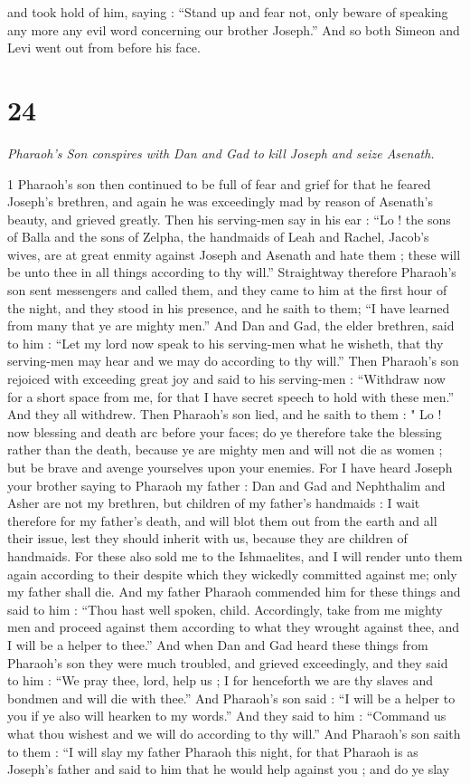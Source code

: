 and took hold of him, saying : “Stand up and fear not, only beware of speaking any more any evil word concerning our brother Joseph.” And so both Simeon and Levi went out from before his face. 

\chapter{24}

\par \textit{Pharaoh's Son conspires with Dan and Gad to kill Joseph and seize Asenath.}


1 Pharaoh's son then continued to be full of fear and grief for that he feared Joseph's brethren, and again he was exceedingly mad by reason of Asenath's beauty, and grieved greatly. Then his serving-men say in his ear : “Lo ! the sons of Balla and the sons of Zelpha, the handmaids of Leah and Rachel, Jacob's wives, are at great enmity against Joseph and Asenath and hate them ; these will be unto thee in all things according to thy will.” Straightway therefore Pharaoh's son sent messengers and called them, and they came to him at the first hour of the night, and they stood in his presence, and he saith to them; “I have learned from many that ye are mighty men.” And Dan and Gad, the elder brethren, said to him : “Let my lord now speak to his serving-men what he wisheth, that thy serving-men may hear and we may do according to thy will.” Then Pharaoh's son rejoiced with exceeding great joy and said to his serving-men : “Withdraw now for a short space from me, for that I have secret speech to hold with these men.” And they all withdrew. Then Pharaoh's son lied, and he saith to them : " Lo ! now blessing and death arc before your faces; do ye therefore take the blessing rather than the death, because ye are mighty men and will not die as women ; but be brave and avenge yourselves upon your enemies. For I have heard Joseph your brother saying to Pharaoh my father : Dan and Gad and Nephthalim and Asher are not my brethren, but children of my father's handmaids : I wait therefore for my father's death, and will blot them out from the earth and all their issue, lest they should inherit with us, because they are children of handmaids. For these also sold me to the Ishmaelites, and I will render unto them again according to their despite which they wickedly committed against me; only my father shall die. And my father Pharaoh commended him for these things and said to him : “Thou hast well spoken, child. Accordingly, take from me mighty men and proceed against them according to what they wrought against thee, and I will be a helper to thee.” And when Dan and Gad heard these things from Pharaoh's son they were much troubled, and grieved exceedingly, and they said to him : “We pray thee, lord, help us ; I for henceforth we are thy slaves and bondmen and will die with thee.” And Pharaoh's son said : “I will be a helper to you if ye also will hearken to my words.” And they said to him : “Command us what thou wishest and we will do according to thy will.” And Pharaoh's son saith to them : “I will slay my father Pharaoh this night, for that Pharaoh is as Joseph's father and said to him that he would help against you ; and do ye slay 